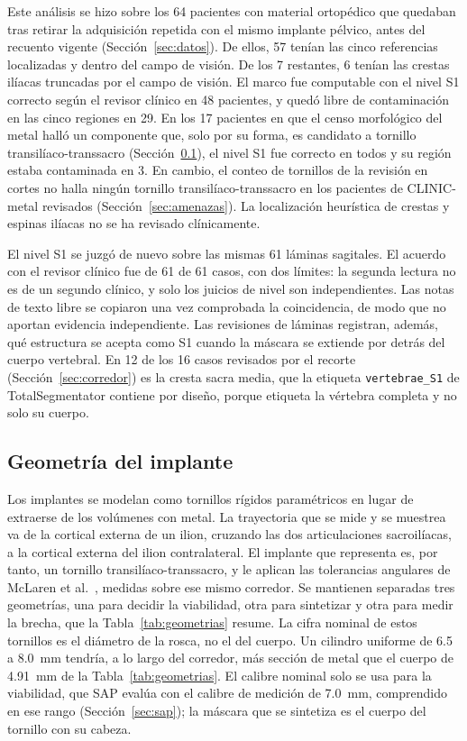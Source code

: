 Este análisis se hizo sobre los 64 pacientes con material ortopédico que quedaban tras retirar la adquisición repetida con el mismo implante pélvico, antes del recuento vigente (Sección~\ref{sec:datos}). De ellos, 57 tenían las cinco referencias localizadas y dentro del campo de visión. De los 7 restantes, 6 tenían las crestas ilíacas truncadas por el campo de visión. El marco fue computable con el nivel S1 correcto según el revisor clínico en 48 pacientes, y quedó libre de contaminación en las cinco regiones en 29. En los 17 pacientes en que el censo morfológico del metal halló un componente que, solo por su forma, es candidato a tornillo transilíaco-transsacro (Sección~\ref{sec:geometria}), el nivel S1 fue correcto en todos y su región estaba contaminada en 3. En cambio, el conteo de tornillos de la revisión en cortes no halla ningún tornillo transilíaco-transsacro en los pacientes de CLINIC-metal revisados (Sección~\ref{sec:amenazas}). La localización heurística de crestas y espinas ilíacas no se ha revisado clínicamente.

El nivel S1 se juzgó de nuevo sobre las mismas 61 láminas sagitales. El acuerdo con el revisor clínico fue de 61 de 61 casos, con dos límites: la segunda lectura no es de un segundo clínico, y solo los juicios de nivel son independientes. Las notas de texto libre se copiaron una vez comprobada la coincidencia, de modo que no aportan evidencia independiente. Las revisiones de láminas registran, además, qué estructura se acepta como S1 cuando la máscara se extiende por detrás del cuerpo vertebral. En 12 de los 16 casos revisados por el recorte (Sección~\ref{sec:corredor}) es la cresta sacra media, que la etiqueta \texttt{vertebrae\_S1} de TotalSegmentator contiene por diseño, porque etiqueta la vértebra completa y no solo su cuerpo.

\subsection{Geometría del implante}\label{sec:geometria}

Los implantes se modelan como tornillos rígidos paramétricos en lugar de extraerse de los volúmenes con metal. La trayectoria que se mide y se muestrea va de la cortical externa de un ilion, cruzando las dos articulaciones sacroilíacas, a la cortical externa del ilion contralateral. El implante que representa es, por tanto, un tornillo transilíaco-transsacro, y le aplican las tolerancias angulares de McLaren et al.~\cite{mclaren2021corridor}, medidas sobre ese mismo corredor. Se mantienen separadas tres geometrías, una para decidir la viabilidad, otra para sintetizar y otra para medir la brecha, que la Tabla~\ref{tab:geometrias} resume. La cifra nominal de estos tornillos es el diámetro de la rosca, no el del cuerpo. Un cilindro uniforme de 6.5 a 8.0~mm tendría, a lo largo del corredor, más sección de metal que el cuerpo de 4.91~mm de la Tabla~\ref{tab:geometrias}. El calibre nominal solo se usa para la viabilidad, que SAP evalúa con el calibre de medición de 7.0~mm, comprendido en ese rango (Sección~\ref{sec:sap}); la máscara que se sintetiza es el cuerpo del tornillo con su cabeza.

